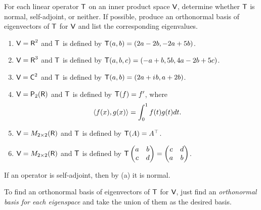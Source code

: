 \begin{exercise} \label{exercise 6.4.2}
For each linear operator \(\textsf{T}\) on an inner product space \(\textsf{V}\), determine whether \(\textsf{T}\) is normal, self-adjoint, or neither.
If possible, produce an orthonormal basis of eigenvectors of \(\textsf{T}\) for \(\textsf{V}\) and list the corresponding eigenvalues.
\begin{enumerate}
\item \(\textsf{V} = \textsf{R}^2\) and \(\textsf{T}\) is defined by \(\textsf{T}(a, b) = (2a - 2b, -2a + 5b)\).
\item \(\textsf{V} = \textsf{R}^3\) and \(\textsf{T}\) is defined by \(\textsf{T}(a, b, c) = (-a + b, 5b, 4a - 2b + 5c)\).
\item \(\textsf{V} = \textsf{C}^2\) and \(\textsf{T}\) is defined by \(\textsf{T}(a, b) = (2a + {i\mkern1mu} b, a + 2b)\).
\item \(\textsf{V} = \textsf{P}_2(\textsf{R})\) and \(\textsf{T}\) is defined by \(\textsf{T}(f) = f'\), where
\[
    \left< f(x), g(x) \right> = \int_0^1 f(t)g(t) dt.
\]
\item \(\textsf{V} = M_{2 \times 2}(\textsf{R})\) and \(\textsf{T}\) is defined by \(\textsf{T}(A) = A^\top\).
\item \(\textsf{V} = M_{2 \times 2}(\textsf{R})\) and \(\textsf{T}\) is defined by \(\textsf{T} \begin{pmatrix} a & b \\ c & d \end{pmatrix} = \begin{pmatrix} c & d \\ a & b \end{pmatrix}\).
\end{enumerate}
\end{exercise}

\begin{note}
If an operator is self-adjoint, then by (a) it is normal.

To find an orthonormal basis of eigenvectors of \(\textsf{T}\) for \(\textsf{V}\), just find an \emph{orthonormal basis for each eigenspace} and take the union of them as the desired basis.
\end{note}

